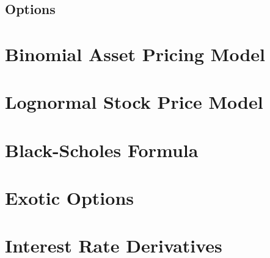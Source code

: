 \documentclass[11pt]{article}
\begin{document}
\subsection{Options}


\pagebreak
\section{Binomial Asset Pricing Model}
\section{Lognormal Stock Price Model}
\section{Black-Scholes Formula}
\section{Exotic Options}
\section{Interest Rate Derivatives}
\end{document}
